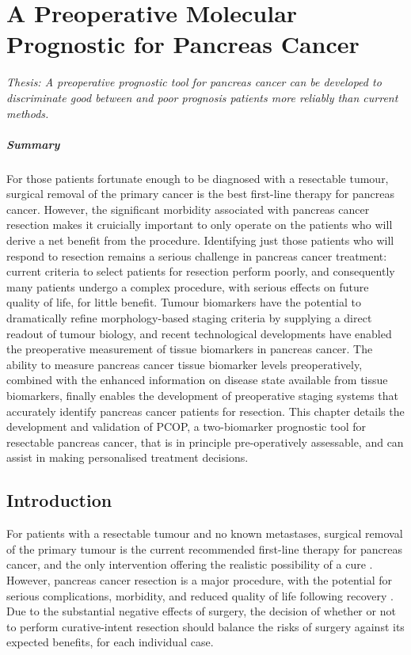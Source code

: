 \documentclass[dissertation.tex]{subfiles}
\begin{document}
\chapter{A Preoperative Molecular Prognostic for Pancreas Cancer}
\label{chap:nomogram}

\emph{Thesis: A preoperative prognostic tool for pancreas cancer can be developed to discriminate good between and poor prognosis patients more reliably than current methods.}

\paragraph{Summary}
For those patients fortunate enough to be diagnosed with a resectable tumour, surgical removal of the primary cancer is the best first-line therapy for pancreas cancer.  However, the significant morbidity associated with pancreas cancer resection makes it cruicially important to only operate on the patients who will derive a net benefit from the procedure.  Identifying just those patients who will respond to resection remains a serious challenge in pancreas cancer treatment: current criteria to select patients for resection perform poorly, and consequently many patients undergo a complex procedure, with serious effects on future quality of life, for little benefit.  Tumour biomarkers have the potential to dramatically refine morphology-based staging criteria by supplying a direct readout of tumour biology, and recent technological developments have enabled the preoperative measurement of tissue biomarkers in pancreas cancer.  The ability to measure pancreas cancer tissue biomarker levels preoperatively, combined with the enhanced information on disease state available from tissue biomarkers, finally enables the development of preoperative staging systems that accurately identify pancreas cancer patients for resection.  This chapter details the development and validation of \gls{PCOP}, a two-biomarker prognostic tool for resectable pancreas cancer, that is in principle pre-operatively assessable, and can assist in making personalised treatment decisions.


\section{Introduction}
For patients with a resectable tumour and no known metastases, surgical removal of the primary tumour is the current recommended first-line therapy for pancreas cancer, and the only intervention offering the realistic possibility of a cure \cite{Editors2015}.  However, pancreas cancer resection is a major procedure, with the potential for serious complications, morbidity, and reduced quality of life following recovery \cite{Ho2005}.  Due to the substantial negative effects of surgery, the decision of whether or not to perform curative-intent resection should balance the risks of surgery against its expected benefits, for each individual case.
\end{document}
